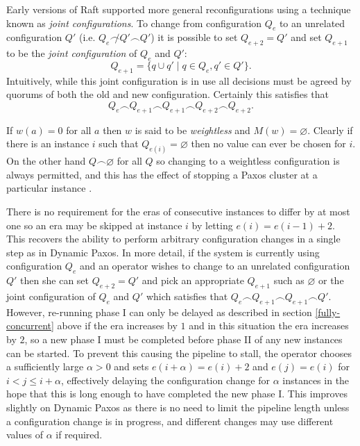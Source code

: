 \documentclass[journal]{IEEEtran}
\begin{document}
Early versions of Raft supported more general reconfigurations using a
technique known as \textit{joint configurations}. To change from configuration
$Q_{e}$ to an unrelated configuration $Q'$ (i.e.  $Q_{e} \not\frown Q' \frown
Q'$) it is possible to set $Q_{e+2} = Q'$ and set $Q_{e+1}$ to be the
\textit{joint configuration} of $Q_{e}$ and $Q'$: \[Q_{e+1} = \{ q \cup q' \mid
q \in Q_{e}, q' \in Q' \}.\] Intuitively, while this joint configuration is in
use all decisions must be agreed by quorums of both the old and new
configuration. Certainly this satisfies that \[Q_{e} \frown Q_{e + 1} \frown
Q_{e+1} \frown Q_{e + 2} \frown Q_{e + 2}.\]

If $w(a) = 0$ for all $a$ then $w$ is said to be \textit{weightless} and $M(w)
= \varnothing$. Clearly if there is an instance $i$ such that $Q_{e(i)} =
\varnothing$ then no value can ever be chosen for $i$. On the other hand $Q
\frown \varnothing$ for all $Q$ so changing to a weightless configuration is
always permitted, and this has the effect of stopping a Paxos cluster at a
particular instance \cite{reconfiguring-a-state-machine,stoppable-paxos}.

There is no requirement for the eras of consecutive instances to differ by at
most one so an era may be skipped at instance $i$ by letting $e(i) = e(i-1) +
2$.  This recovers the ability to perform arbitrary configuration changes in a
single step as in Dynamic Paxos. In more detail, if the system is currently
using configuration $Q_{e}$ and an operator wishes to change to an unrelated
configuration $Q'$ then she can set $Q_{e+2} = Q'$ and pick an appropriate
$Q_{e+1}$ such as $\varnothing$ or the joint configuration of $Q_{e}$ and $Q'$
which satisfies that $Q_{e} \frown Q_{e + 1} \frown Q_{e+1} \frown Q'$.
However, re-running phase I can only be delayed as described in section
\ref{fully-concurrent} above if the era increases by $1$ and in this situation
the era increases by $2$, so a new phase I must be completed before phase II of
any new instances can be started.  To prevent this causing the pipeline to
stall, the operator chooses a sufficiently large $\alpha > 0$ and sets
$e(i+\alpha) = e(i)+2$ and $e(j) = e(i)$ for $i < j \le i + \alpha$,
effectively delaying the configuration change for $\alpha$ instances in the
hope that this is long enough to have completed the new phase I. This improves
slightly on Dynamic Paxos as there is no need to limit the pipeline length
unless a configuration change is in progress, and different changes may use
different values of $\alpha$ if required.
\end{document}
